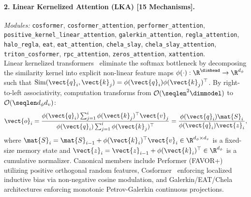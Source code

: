 \paragraph{2. Linear Kernelized Attention (LKA) [15 Mechanisms].}
\textit{Modules:} \texttt{cosformer}, \texttt{cosformer\_attention}, \texttt{performer\_attention}, \texttt{positive\_kernel\_linear\_attention}, \texttt{galerkin\_attention}, \texttt{regla\_attention}, \texttt{halo\_regla}, \texttt{eat}, \texttt{eat\_attention}, \texttt{chela\_slay}, \texttt{chela\_slay\_attention}, \texttt{triton\_cosformer}, \texttt{rpc\_attention}, \texttt{zeros\_attention}, \texttt{xattention}. \\
Linear kernelized transformers~\cite{katharopoulos2020transformers} eliminate the softmax bottleneck by decomposing the similarity kernel into explicit non-linear feature maps $\phi(\cdot): \R^{\dimhead} \to \R^{d_\phi}$ such that $\operatorname{Sim}(\vect{q}_i, \vect{k}_j) = \phi(\vect{q}_i) \phi(\vect{k}_j)^\top$. By right-to-left associativity, computation transforms from $\mathcal{O}(\seqlen^2 \dimmodel)$ to $\mathcal{O}(\seqlen d_\phi d_v)$:
\begin{equation}
\vect{o}_i = \frac{\phi(\vect{q}_i) \sum_{j=1}^i \phi(\vect{k}_j)^\top \vect{v}_j}{\phi(\vect{q}_i) \sum_{j=1}^i \phi(\vect{k}_j)^\top} = \frac{\phi(\vect{q}_i) \mat{S}_i}{\phi(\vect{q}_i) \vect{z}_i},
\end{equation}
where $\mat{S}_i = \mat{S}_{i-1} + \phi(\vect{k}_i)^\top \vect{v}_i \in \R^{d_\phi \times d_v}$ is a fixed-size memory state and $\vect{z}_i = \vect{z}_{i-1} + \phi(\vect{k}_i)^\top \in \R^{d_\phi}$ is a cumulative normalizer. Canonical members include Performer (FAVOR+)~\cite{choromanski2021performer} utilizing positive orthogonal random features, Cosformer~\cite{qin2022cosformer} enforcing localized inductive bias via non-negative cosine modulation, and Galerkin/EAT/Chela architectures enforcing monotonic Petrov-Galerkin continuous projections.

